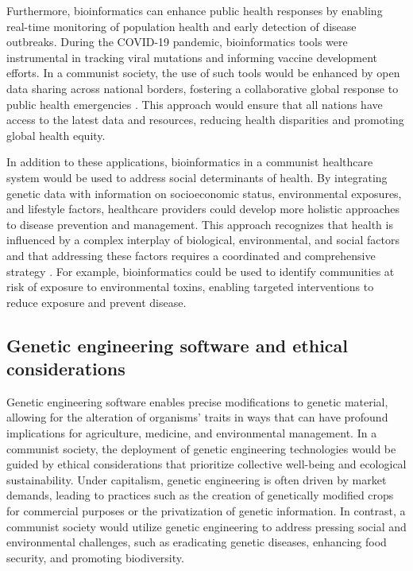 Furthermore, bioinformatics can enhance public health responses by enabling real-time monitoring of population health and early detection of disease outbreaks. During the COVID-19 pandemic, bioinformatics tools were instrumental in tracking viral mutations and informing vaccine development efforts. In a communist society, the use of such tools would be enhanced by open data sharing across national borders, fostering a collaborative global response to public health emergencies \cite[pp.~35-40]{lee2020pandemics}. This approach would ensure that all nations have access to the latest data and resources, reducing health disparities and promoting global health equity.

In addition to these applications, bioinformatics in a communist healthcare system would be used to address social determinants of health. By integrating genetic data with information on socioeconomic status, environmental exposures, and lifestyle factors, healthcare providers could develop more holistic approaches to disease prevention and management. This approach recognizes that health is influenced by a complex interplay of biological, environmental, and social factors and that addressing these factors requires a coordinated and comprehensive strategy \cite[pp.~201-210]{smith2018inequalities}. For example, bioinformatics could be used to identify communities at risk of exposure to environmental toxins, enabling targeted interventions to reduce exposure and prevent disease.

\subsection{Genetic engineering software and ethical considerations}

Genetic engineering software enables precise modifications to genetic material, allowing for the alteration of organisms' traits in ways that can have profound implications for agriculture, medicine, and environmental management. In a communist society, the deployment of genetic engineering technologies would be guided by ethical considerations that prioritize collective well-being and ecological sustainability. Under capitalism, genetic engineering is often driven by market demands, leading to practices such as the creation of genetically modified crops for commercial purposes or the privatization of genetic information. In contrast, a communist society would utilize genetic engineering to address pressing social and environmental challenges, such as eradicating genetic diseases, enhancing food security, and promoting biodiversity.

